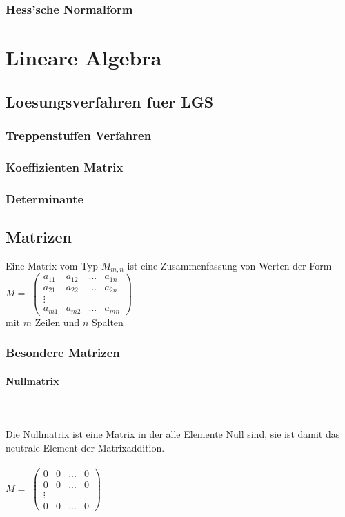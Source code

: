 \documentclass[a4paper]{article} %
\begin{document}
	\subsubsection{Hess'sche Normalform}
	\section{Lineare Algebra}
	\subsection{Loesungsverfahren fuer LGS}
	\subsubsection{Treppenstuffen Verfahren}
	\subsubsection{Koeffizienten Matrix}
	\subsubsection{Determinante}
	\pagebreak
	\subsection{Matrizen}
	 \hspace{0 cm} 
	Eine Matrix vom Typ $M_{m,n}$ ist eine Zusammenfassung von Werten der Form $M =$
	$
	\begin{pmatrix}
		a_{11} & a_{12} & ... 	& a_{1n}\\
		a_{21} & a_{22} & ...		 & a_{2n}\\
	      \vdots    	&      &	    \\
		a_{m1} & a_{m2} & ...	& a_{mn}
	\end{pmatrix}
	$\\
	 mit $m$ Zeilen und $n$ Spalten
	\subsubsection{Besondere Matrizen}
		\paragraph{Nullmatrix  } 
		\hspace{0 cm} \\ \noindent \\
		Die Nullmatrix ist eine Matrix in der alle Elemente Null sind, sie ist damit das neutrale Element der Matrixaddition.\\
		\\$M =$
		$
		\begin{pmatrix}
		0 & 0 	& ... 	& 0\\
		0 & 0 	& ...	& 0\\
		\vdots  &      	&  \\
		0 & 0	& ...	& 0
		\end{pmatrix}
		$\\
	
\end{document}
